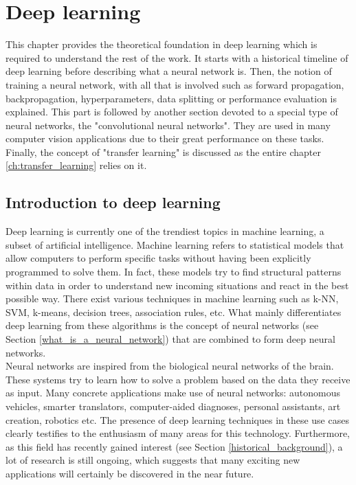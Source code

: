 
\chapter{Deep learning}
\label{ch:deep_learning}

\setlength{\marginparwidth}{3cm}\leavevmode {}This chapter provides the theoretical foundation in deep learning which is required to understand the rest of the work. It starts with a historical timeline of deep learning before describing what a neural network is. Then, the notion of training a neural network, with all that is involved such as forward propagation, backpropagation, hyperparameters, data splitting or performance evaluation is explained. This part is followed by another section devoted to a special type of neural networks, the "convolutional neural networks". They are used in many computer vision applications due to their great performance on these tasks. Finally, the concept of "transfer learning" is discussed as the entire chapter \ref{ch:transfer_learning} relies on it.


\section{Introduction to deep learning}

\setlength{\marginparwidth}{3cm}\leavevmode {}Deep learning is currently one of the trendiest topics in machine learning, a subset of artificial intelligence. Machine learning refers to statistical models that allow computers to perform specific tasks without having been explicitly programmed to solve them. In fact, these models try to find structural patterns within data in order to understand new incoming situations and react in the best possible way. There exist various techniques in machine learning such as k-NN, SVM, k-means, decision trees, association rules, etc. What mainly differentiates deep learning from these algorithms is the concept of neural networks (see Section  \ref{what_is_a_neural_network}) that are combined to form deep neural networks.\\
Neural networks are inspired from the biological neural networks of the brain. These systems try to learn how to solve a problem based on the data they receive as input. Many concrete applications make use of neural networks: autonomous vehicles, smarter translators, computer-aided diagnoses, personal assistants, art creation, robotics etc. The presence of deep learning techniques in these use cases clearly testifies to the enthusiasm of many areas for this technology. Furthermore, as this field has recently gained interest (see Section \ref{historical_background}), a lot of research is still ongoing, which suggests that many exciting new applications will certainly be discovered in the near future.

